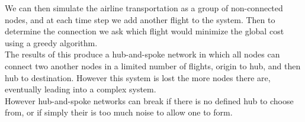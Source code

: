 \documentclass[a4paper, 11pt]{report}
\begin{document}
We can then simulate the airline transportation as a group of
non-connected nodes, and at each time step we add another
flight to the system. Then to determine the connection we
ask which flight would minimize the global cost using a
greedy algorithm. \\

The results of this produce a hub-and-spoke network in which
all nodes can connect two another nodes in a limited number
of flights, origin to hub, and then hub to destination.
However this system is lost the more nodes there are,
eventually leading into a complex system. \\

However hub-and-spoke networks can break if there is no
defined hub to choose from, or if simply their is too much
noise to allow one to form.
\end{document}
